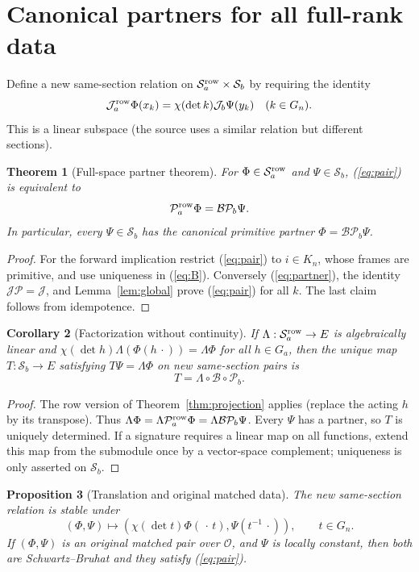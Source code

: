 \documentclass[11pt]{article}
\newtheorem{theorem}{Theorem}[section]
\newtheorem{proposition}[theorem]{Proposition}
\newtheorem{corollary}[theorem]{Corollary}
\theoremstyle{remark}\newtheorem{remark}[theorem]{Remark}
\newcommand{\SB}{\mathcal S}
\newcommand{\Orb}{\mathcal J}
\newcommand{\Prj}{\mathcal P}
\newcommand{\Match}{\mathcal B}
\newcommand{\oo}{\mathcal O}
\begin{document}
\section{Canonical partners for all full-rank data}\label{sec:partners}
Define a new same-section relation on $\SB_a^{\rm row}\times\SB_b$ by requiring the identity
\begin{equation}\label{eq:pair}
 \Orb_a^{\rm row}\Phi(x_k)=\chi(\det k)\Orb_b\Psi(y_k)
 \quad(k\in G_n).
\end{equation}
This is a linear subspace (the source uses a similar relation but different sections).
\begin{theorem}[Full-space partner theorem]\label{thm:partner}
For $\Phi\in\SB_a^{\rm row}$ and $\Psi\in\SB_b$, (\ref{eq:pair}) is equivalent to
\begin{equation}\label{eq:partner}
 \Prj_a^{\rm row}\Phi=\Match\Prj_b\Psi.
\end{equation}
In particular, every $\Psi\in\SB_b$ has the canonical primitive partner $\Phi=\Match\Prj_b\Psi$.
\end{theorem}
\begin{proof}
For the forward implication restrict (\ref{eq:pair}) to $i\in K_n$, whose frames are primitive, and use uniqueness in (\ref{eq:B}). Conversely (\ref{eq:partner}), the identity $\Orb\Prj=\Orb$, and Lemma~\ref{lem:global} prove (\ref{eq:pair}) for all $k$. The last claim follows from idempotence.
\end{proof}
\begin{corollary}[Factorization without continuity]\label{cor:factor}
If $\Lambda:\SB_a^{\rm row}\to E$ is algebraically linear and $\chi(\det h)\Lambda(\Phi(h\,\cdot))=\Lambda\Phi$ for all $h\in G_a$, then the unique map $T:\SB_b\to E$ satisfying $T\Psi=\Lambda\Phi$ on new same-section pairs is
\[
 \boxed{T=\Lambda\circ\Match\circ\Prj_b.}
\]
\end{corollary}
\begin{proof}
The row version of Theorem~\ref{thm:projection} applies (replace the acting $h$ by its transpose). Thus $\Lambda\Phi=\Lambda\Prj_a^{\rm row}\Phi=\Lambda\Match\Prj_b\Psi$. Every $\Psi$ has a partner, so $T$ is uniquely determined. If a signature requires a linear map on all functions, extend this map from the submodule once by a vector-space complement; uniqueness is only asserted on $\SB_b$.
\end{proof}
\begin{proposition}[Translation and original matched data]\label{prop:translate}
The new same-section relation is stable under
\[
 (\Phi,\Psi)\mapsto (\chi(\det t)\Phi(\,\cdot\,t),\Psi(t^{-1}\,\cdot)),\qquad t\in G_n.
\]
If $(\Phi,\Psi)$ is an original matched pair over $\oo$, and $\Psi$ is locally constant, then both are Schwartz--Bruhat and they satisfy (\ref{eq:pair}).
\end{proposition}
\end{document}
